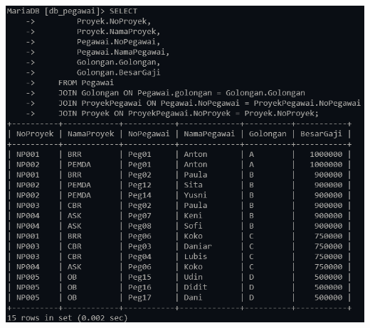 \documentclass[12pt,titlepage]{article}
\begin{document}
\begin{enumerate}
\begin{enumerate}
        \includegraphics[width=.85\textwidth]{images/figures/tugas-2_f_3.png}
    \end{enumerate}
\end{enumerate}
\end{document}
